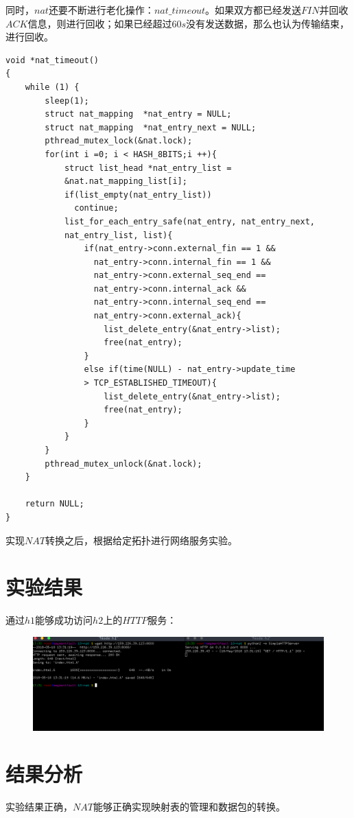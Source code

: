 \documentclass[UTF8,noindent]{ctexart}
\begin{document}
同时，$nat$还要不断进行老化操作：$nat\_timeout$。如果双方都已经发送$FIN$并回收$ACK$信息，则进行回收；如果已经超过$60s$没有发送数据，那么也认为传输结束，进行回收。
\begin{lstlisting}
void *nat_timeout()
{
	while (1) {
		sleep(1);
		struct nat_mapping  *nat_entry = NULL;
		struct nat_mapping  *nat_entry_next = NULL;
		pthread_mutex_lock(&nat.lock);
		for(int i =0; i < HASH_8BITS;i ++){
			struct list_head *nat_entry_list = 
			&nat.nat_mapping_list[i];
			if(list_empty(nat_entry_list))  
			  continue;
			list_for_each_entry_safe(nat_entry, nat_entry_next,
			nat_entry_list, list){
				if(nat_entry->conn.external_fin == 1 && 
			      nat_entry->conn.internal_fin == 1 && 
				  nat_entry->conn.external_seq_end == 
				  nat_entry->conn.internal_ack &&
		 		  nat_entry->conn.internal_seq_end == 
				  nat_entry->conn.external_ack){
					list_delete_entry(&nat_entry->list);
					free(nat_entry);
				}
				else if(time(NULL) - nat_entry->update_time
				> TCP_ESTABLISHED_TIMEOUT){
					list_delete_entry(&nat_entry->list);
					free(nat_entry);
				}
			}
		}
		pthread_mutex_unlock(&nat.lock);
	}

	return NULL;
}
\end{lstlisting}

实现$NAT$转换之后，根据给定拓扑进行网络服务实验。
\section*{{实验结果}}
通过$h1$能够成功访问$h2$上的$HTTP$服务：
\begin{figure}[H]
  \centering
  \includegraphics[scale=0.3]{1.png}
\end{figure}
\section*{{结果分析}}
实验结果正确，$NAT$能够正确实现映射表的管理和数据包的转换。
\end{document}
